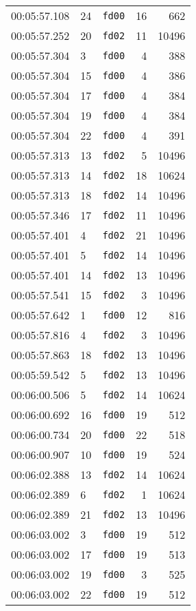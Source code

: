 \documentclass{article}
\begin{document}
\begin{longtable}{lllrr}
00:05:57.108 & 24 & \texttt{fd00} & 16 & 662 \\
00:05:57.252 & 20 & \texttt{fd02} & 11 & 10496 \\
00:05:57.304 & 3 & \texttt{fd00} & 4 & 388 \\
00:05:57.304 & 15 & \texttt{fd00} & 4 & 386 \\
00:05:57.304 & 17 & \texttt{fd00} & 4 & 384 \\
00:05:57.304 & 19 & \texttt{fd00} & 4 & 384 \\
00:05:57.304 & 22 & \texttt{fd00} & 4 & 391 \\
00:05:57.313 & 13 & \texttt{fd02} & 5 & 10496 \\
00:05:57.313 & 14 & \texttt{fd02} & 18 & 10624 \\
00:05:57.313 & 18 & \texttt{fd02} & 14 & 10496 \\
00:05:57.346 & 17 & \texttt{fd02} & 11 & 10496 \\
00:05:57.401 & 4 & \texttt{fd02} & 21 & 10496 \\
00:05:57.401 & 5 & \texttt{fd02} & 14 & 10496 \\
00:05:57.401 & 14 & \texttt{fd02} & 13 & 10496 \\
00:05:57.541 & 15 & \texttt{fd02} & 3 & 10496 \\
00:05:57.642 & 1 & \texttt{fd00} & 12 & 816 \\
00:05:57.816 & 4 & \texttt{fd02} & 3 & 10496 \\
00:05:57.863 & 18 & \texttt{fd02} & 13 & 10496 \\
00:05:59.542 & 5 & \texttt{fd02} & 13 & 10496 \\
00:06:00.506 & 5 & \texttt{fd02} & 14 & 10624 \\
00:06:00.692 & 16 & \texttt{fd00} & 19 & 512 \\
00:06:00.734 & 20 & \texttt{fd00} & 22 & 518 \\
00:06:00.907 & 10 & \texttt{fd00} & 19 & 524 \\
00:06:02.388 & 13 & \texttt{fd02} & 14 & 10624 \\
00:06:02.389 & 6 & \texttt{fd02} & 1 & 10624 \\
00:06:02.389 & 21 & \texttt{fd02} & 13 & 10496 \\
00:06:03.002 & 3 & \texttt{fd00} & 19 & 512 \\
00:06:03.002 & 17 & \texttt{fd00} & 19 & 513 \\
00:06:03.002 & 19 & \texttt{fd00} & 3 & 525 \\
00:06:03.002 & 22 & \texttt{fd00} & 19 & 512 \\

\end{longtable}
\end{document}
